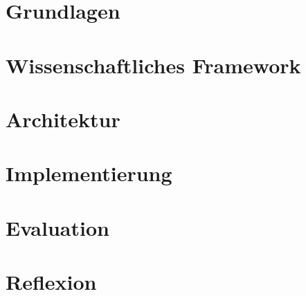 	\chapter{Grundlagen}
		\label{chap:grundlagen}
		
		
	\chapter{Wissenschaftliches Framework}
		\label{chap:wissenschaftliches_framework}
		
		
	\chapter{Architektur}
		\label{chap:architektur}
		
		
	\chapter{Implementierung}
		\label{chap:implementierung}
		
		
	\chapter{Evaluation}
		\label{chap:evaluation}
		
	\chapter{Reflexion}
		\label{chap:reflexion}


	\pagestyle{plain}
	\clearpage
	\printbibliography

